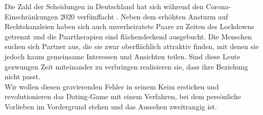 
Die Zahl der Scheidungen in Deutschland hat sich während den Corona-Einschränkungen 2020 verfünffacht \cite{scheidungen}. Neben dem erhöhten Ansturm auf Rechtskanzleien haben sich auch unverheiratete Paare zu Zeiten des Lockdowns getrennt und die Paartherapien sind flächendeckend ausgebucht. Die Menschen suchen sich Partner aus, die sie zwar oberflächlich attraktiv finden, mit denen sie jedoch kaum gemeinsame Interessen und Ansichten teilen. Sind diese Leute gezwungen Zeit miteinander zu verbringen realisieren sie, dass ihre Beziehung nicht passt.\\
Wir wollen diesen gravierenden Fehler in seinem Keim ersticken und revolutionieren das Dating-Game mit einem Verfahren, bei dem persönliche Vorlieben im Vordergrund stehen und das Aussehen zweitrangig ist.


